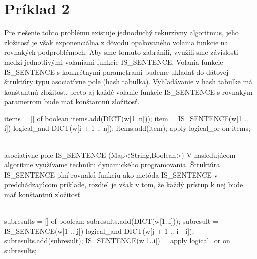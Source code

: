 \documentclass[paper=a4, fontsize=11pt]{scrartcl} %
\numberwithin{equation}{section} %
\numberwithin{figure}{section} %
\numberwithin{table}{section} %
\begin{document}
\pagebreak


\section*{Príklad 2}

Pre riešenie tohto problému existuje jednoduchý rekurzívny algoritmus, jeho zložitosť je však exponenciálna z dôvodu opakovaného volania funkcie na rovnakých podproblémoch.
Aby sme tomuto zabránili, využili sme závislosti medzi jednotlivými volaniami funkcie IS\_SENTENCE. Volania funkcie IS\_SENTENCE s konkrétnymi parametrami budeme ukladať do dátovej štruktúry typu asociatívne pole (hash tabulka). Vyhľadávanie v hash tabulke má konštantnú zložitosť, preto aj každé volanie funkcie IS\_SENTENCE s rovnakým parametrom bude mať konštantnú zložitosť. \\

\begin{algorithmic}[1]
        \State items = [] of boolean
        \State items.add(DICT(w[1..n]));
        	\State item = IS\_SENTENCE(w[1 .. i]) logical\_and DICT(w[i + 1 .. n]);
		\State items.add(item);
        \EndFor
        \State \Return apply logical\_or on items;
    \EndFunction
\end{algorithmic}
\ \\

asociatívne pole IS\_SENTENCE (Map<String,Boolean>)
V nasledujúcom algoritme využívame techniku dynamického programovania.
Štruktúra IS\_SENTENCE plní rovnakú funkciu ako metóda IS\_SENTENCE v predchádzajúcom príklade, rozdiel je však v tom, že každý prístup k nej bude mať konštantnú zložitosť \\
\\
\begin{algorithmic}[1]
    		\State subresults = [] of boolean;
		\State subresults.add(DICT(w[1..i]));
    			\State subresult = IS\_SENTENCE(w[1 .. j]) logical\_and DICT(w[j + 1 .. i - i]);
    			\State subresults.add(subresult);
    		\EndFor
    		\State \Return IS\_SENTENCE(w[1..i]) = apply logical\_or on subresults;
	\EndFor
    \EndFunction
\end{algorithmic}
\ \\
 
\end{document}
